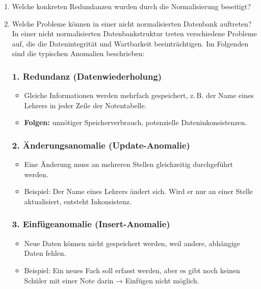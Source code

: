 \documentclass[a4paper,12pt]{article}
\begin{document}
\begin{enumerate}
			
			\item Welche konkreten Redundanzen wurden durch die Normalisierung beseitigt?
			\item Welche Probleme können in einer nicht normalisierten Datenbank auftreten?\\
			
			In einer nicht normalisierten Datenbankstruktur treten verschiedene Probleme auf, die die Datenintegrität und Wartbarkeit beeinträchtigen. Im Folgenden sind die typischen Anomalien beschrieben:
			
			\subsubsection*{1. Redundanz (Datenwiederholung)}
			
			\begin{itemize}
				\item Gleiche Informationen werden mehrfach gespeichert, z.\,B. der Name eines Lehrers in jeder Zeile der Notentabelle.
				\item \textbf{Folgen:} unnötiger Speicherverbrauch, potenzielle Dateninkonsistenzen.
			\end{itemize}
			
			\vspace{0.5em}
			
			\subsubsection*{2. Änderungsanomalie (Update-Anomalie)}
			
			\begin{itemize}
				\item Eine Änderung muss an mehreren Stellen gleichzeitig durchgeführt werden.
				\item Beispiel: Der Name eines Lehrers ändert sich. Wird er nur an einer Stelle aktualisiert, entsteht Inkonsistenz.
			\end{itemize}
			
			\vspace{0.5em}
			
			\subsubsection*{3. Einfügeanomalie (Insert-Anomalie)}
			
			\begin{itemize}
				\item Neue Daten können nicht gespeichert werden, weil andere, abhängige Daten fehlen.
				\item Beispiel: Ein neues Fach soll erfasst werden, aber es gibt noch keinen Schüler mit einer Note darin → Einfügen nicht möglich.
			\end{itemize}
			

\end{enumerate}
\end{document}
